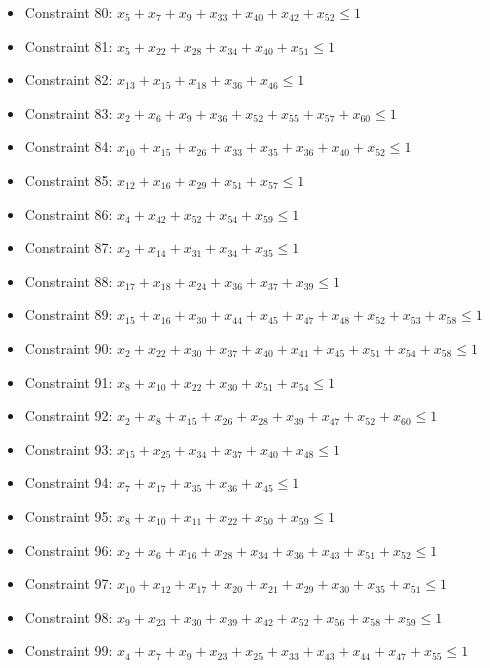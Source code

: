 \documentclass[11pt]{article}
\begin{document}
\begin{itemize}
\item Constraint 80: $x_{5} + x_{7} + x_{9} + x_{33} + x_{40} + x_{42} + x_{52} \le 1$
\item Constraint 81: $x_{5} + x_{22} + x_{28} + x_{34} + x_{40} + x_{51} \le 1$
\item Constraint 82: $x_{13} + x_{15} + x_{18} + x_{36} + x_{46} \le 1$
\item Constraint 83: $x_{2} + x_{6} + x_{9} + x_{36} + x_{52} + x_{55} + x_{57} + x_{60} \le 1$
\item Constraint 84: $x_{10} + x_{15} + x_{26} + x_{33} + x_{35} + x_{36} + x_{40} + x_{52} \le 1$
\item Constraint 85: $x_{12} + x_{16} + x_{29} + x_{51} + x_{57} \le 1$
\item Constraint 86: $x_{4} + x_{42} + x_{52} + x_{54} + x_{59} \le 1$
\item Constraint 87: $x_{2} + x_{14} + x_{31} + x_{34} + x_{35} \le 1$
\item Constraint 88: $x_{17} + x_{18} + x_{24} + x_{36} + x_{37} + x_{39} \le 1$
\item Constraint 89: $x_{15} + x_{16} + x_{30} + x_{44} + x_{45} + x_{47} + x_{48} + x_{52} + x_{53} + x_{58} \le 1$
\item Constraint 90: $x_{2} + x_{22} + x_{30} + x_{37} + x_{40} + x_{41} + x_{45} + x_{51} + x_{54} + x_{58} \le 1$
\item Constraint 91: $x_{8} + x_{10} + x_{22} + x_{30} + x_{51} + x_{54} \le 1$
\item Constraint 92: $x_{2} + x_{8} + x_{15} + x_{26} + x_{28} + x_{39} + x_{47} + x_{52} + x_{60} \le 1$
\item Constraint 93: $x_{15} + x_{25} + x_{34} + x_{37} + x_{40} + x_{48} \le 1$
\item Constraint 94: $x_{7} + x_{17} + x_{35} + x_{36} + x_{45} \le 1$
\item Constraint 95: $x_{8} + x_{10} + x_{11} + x_{22} + x_{50} + x_{59} \le 1$
\item Constraint 96: $x_{2} + x_{6} + x_{16} + x_{28} + x_{34} + x_{36} + x_{43} + x_{51} + x_{52} \le 1$
\item Constraint 97: $x_{10} + x_{12} + x_{17} + x_{20} + x_{21} + x_{29} + x_{30} + x_{35} + x_{51} \le 1$
\item Constraint 98: $x_{9} + x_{23} + x_{30} + x_{39} + x_{42} + x_{52} + x_{56} + x_{58} + x_{59} \le 1$
\item Constraint 99: $x_{4} + x_{7} + x_{9} + x_{23} + x_{25} + x_{33} + x_{43} + x_{44} + x_{47} + x_{55} \le 1$

\end{itemize}
\end{document}
